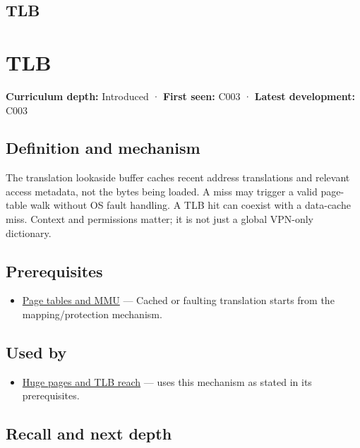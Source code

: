 \hypertarget{appendix-7a2d9c5ce511}{}
\section*{TLB}
\chapter{TLB}\label{appendix-7a2d9c5ce511-tlb}

\textbf{Curriculum depth:} Introduced · \textbf{First seen:} C003 · \textbf{Latest development:} C003

\section{Definition and mechanism}\label{appendix-7a2d9c5ce511-definition-and-mechanism}

The translation lookaside buffer caches recent address translations and relevant access metadata, not the bytes being loaded. A miss may trigger a valid page-table walk without OS fault handling. A TLB hit can coexist with a data-cache miss. Context and permissions matter; it is not just a global VPN-only dictionary.

\section{Prerequisites}\label{appendix-7a2d9c5ce511-prerequisites}

\begin{itemize}
\tightlist
\item
  \hyperref[appendix-01e5905165c4]{Page tables and MMU} --- Cached or faulting translation starts from the mapping/protection mechanism.
\end{itemize}

\section{Used by}\label{appendix-7a2d9c5ce511-used-by}

\begin{itemize}
\tightlist
\item
  \hyperref[appendix-ce688d1acdab]{Huge pages and TLB reach} --- uses this mechanism as stated in its prerequisites.
\end{itemize}

\section{Recall and next depth}\label{appendix-7a2d9c5ce511-recall-and-next-depth}

